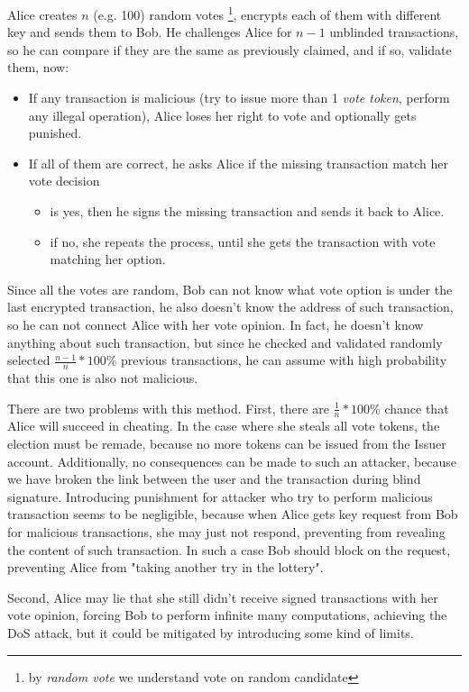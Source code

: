 \documentclass[runningheads]{llncs}
\begin{document}
Alice creates \(n\) (e.g. 100) random votes \footnote{by \textit{random vote} we understand vote on random candidate}, encrypts each of them with different key and sends them to Bob. He challenges Alice for \(n-1\) unblinded transactions, so he can compare if they are the same as previously claimed, and if so, validate them, now: 
\begin{itemize}
 \item If any transaction is malicious (try to issue more than 1 \textit{vote token}, perform any illegal operation), Alice loses her right to vote and optionally gets punished.

 \item If all of them are correct, he asks Alice if the missing transaction match her vote decision
 \begin{itemize}
    \item is yes, then he signs the missing transaction and sends it back to Alice.
    \item if no, she repeats the process, until she gets the transaction with vote matching her option.
 \end{itemize}
\end{itemize}
Since all the votes are random, Bob can not know what vote option is under the last encrypted transaction, he also doesn't know the address of such transaction, so he can not connect Alice with her vote opinion. In fact, he doesn't know anything about such transaction, but since he checked and validated randomly selected \(\frac{n-1}{n}*100\%\) previous transactions, he can assume with high probability that this one is also not malicious.

There are two problems with this method.
First, there are \(\frac{1}{n}*100\%\) chance that Alice will succeed in cheating. In the case where she steals all vote tokens, the election must be remade, because no more tokens can be issued from the Issuer account. Additionally, no consequences can be made to such an attacker, because we have broken the link between the user and the transaction during blind signature. Introducing punishment for attacker who try to perform malicious transaction seems to be negligible, because when Alice gets key request from Bob for malicious transactions, she may just not respond, preventing from revealing the content of such transaction. In such a case Bob should block on the request, preventing Alice from "taking another try in the lottery".

Second, Alice may lie that she still didn't receive signed transactions with her vote opinion, forcing Bob to perform infinite many computations, achieving the DoS attack, but it could be mitigated by introducing some kind of limits.
\end{document}
